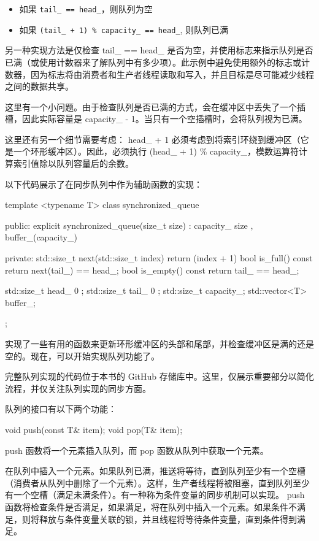 \begin{itemize}
\item
如果 \verb|tail_ == head_|，则队列为空

\item
如果 \verb|(tail_ + 1) % capacity_ == head_|, 则队列已满
\end{itemize}

另一种实现方法是仅检查 tail\_ == head\_ 是否为空，并使用标志来指示队列是否已满（或使用计数器来了解队列中有多少项）。此示例中避免使用额外的标志或计数器，因为标志将由消费者和生产者线程读取和写入，并且目标是尽可能减少线程之间的数据共享。

这里有一个小问题。由于检查队列是否已满的方式，会在缓冲区中丢失了一个插槽，因此实际容量是 capacity\_ - 1。当只有一个空插槽时，会将队列视为已满。

这里还有另一个细节需要考虑： head\_ + 1 必须考虑到将索引环绕到缓冲区（它是一个环形缓冲区）。因此，必须执行 (head\_ + 1) \% capacity\_，模数运算符计算索引值除以队列容量后的余数。

以下代码展示了在同步队列中作为辅助函数的实现：

\begin{cpp}
template <typename T>
class synchronized_queue {
public:
    explicit synchronized_queue(size_t size) :
        capacity_{ size }, buffer_(capacity_) {
    }

private:
    std::size_t next(std::size_t index) {
        return (index + 1)%
    }
    bool is_full() const {
        return next(tail_) == head_;
    }
    bool is_empty() const {
        return tail_ == head_;
    }

    std::size_t head_{ 0 };
    std::size_t tail_{ 0 };
    std::size_t capacity_;
    std::vector<T> buffer_;
};
\end{cpp}

实现了一些有用的函数来更新环形缓冲区的头部和尾部，并检查缓冲区是满的还是空的。现在，可以开始实现队列功能了。

完整队列实现的代码位于本书的 GitHub 存储库中。这里，仅展示重要部分以简化流程，并仅关注队列实现的同步方面。

队列的接口有以下两个功能：

\begin{cpp}
void push(const T& item);
void pop(T& item);
\end{cpp}

push 函数将一个元素插入队列，而 pop 函数从队列中获取一个元素。

在队列中插入一个元素。如果队列已满，推送将等待，直到队列至少有一个空槽（消费者从队列中删除了一个元素）。这样，生产者线程将被阻塞，直到队列至少有一个空槽（满足未满条件）。有一种称为条件变量的同步机制可以实现。 push 函数将检查条件是否满足，如果满足，将在队列中插入一个元素。如果条件不满足，则将释放与条件变量关联的锁，并且线程将等待条件变量，直到条件得到满足。

